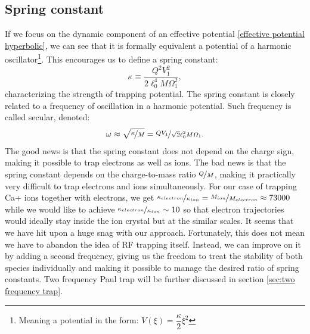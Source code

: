 \subsection{Spring constant}
\label{sec:spring constant}
If we focus on the dynamic component of an effective potential \eqref{effective potential hyperbolic}, we can see that it is formally equivalent a potential of a harmonic oscillator\footnote{Meaning a potential in the form: $V(\xi) = \dfrac{\kappa}{2} \xi^2$}. This encourages us to define a spring constant: 
\begin{equation}
	\label{spring constant}
	\kappa \equiv \dfrac{Q^2 V_1^2}{2\ell_0^4 M \Omega_1^2},
\end{equation}
characterizing the strength of trapping potential. The spring constant is closely related to a frequency of oscillation in a harmonic potential. Such frequency is called secular, denoted: 
\begin{equation}
	\label{secular frequency}
	\omega \approx \sqrt{\nicefrac{\kappa}{M}} = \nicefrac{Q V_1}{\sqrt{2}\ell_0^2 M \Omega_1}.
\end{equation}
The good news is that the spring constant does not depend on the charge sign, making it possible to trap electrons as well as ions. The bad news is that the spring constant depends on the charge-to-mass ratio $\nicefrac{Q}{M}$, making it practically very difficult to trap electrons and ions simultaneously. For our case of trapping Ca+ ions together with electrons, we get $\nicefrac{\kappa_{electron}}{\kappa_{ion}} = \nicefrac{M_{ion}}{M_{electron}} \approx 73000$ while we would like to achieve $\nicefrac{\kappa_{electron}}{\kappa_{ion}} \sim 10$ so that electron trajectories would ideally stay inside the ion crystal but at the similar scales. It seems that we have hit upon a huge snag with our approach. Fortunately, this does not mean we have to abandon the idea of RF trapping itself. Instead, we can improve on it by adding a second frequency, giving us the freedom to treat the stability of both species individually and making it possible to manage the desired ratio of spring constants. Two frequency Paul trap will be further discussed in section \ref{sec:two frequency trap}.


